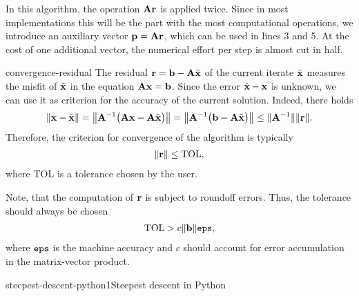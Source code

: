 \begin{remark}
  In this algorithm, the operation $\mata\vr$ is applied twice. Since
  in most implementations this will be the part with the most
  computational operations, we introduce an auxiliary vector
  $\vp = \mata\vr$, which can be used in lines 3 and 5. At the cost of
  one additional vector, the numerical effort per step is almost
  cut in half.
\end{remark}

\begin{Remark}{convergence-residual}
  The residual $\vr = \vb - \mata\tilde\vx$ of the current iterate
  $\tilde\vx$ measures the misfit of $\tilde\vx$ in the equation
  $\mata\vx = \vb$. Since the error $\tilde\vx-\vx$ is unknown, we can
  use it as criterion for the accuracy of the current
  solution. Indeed, there holds
  \begin{gather}
    \norm{\vx-\tilde\vx}
    = \norm*{\mata^{-1}\bigl(\mata\vx - \mata\tilde\vx\bigr)}
    = \norm*{\mata^{-1}\bigl(\vb - \mata\tilde\vx\bigr)}
    \le \norm{\mata^{-1}}\norm{\vr}.
  \end{gather}
  Therefore, the criterion for convergence of the algorithm is typically
  \begin{gather}
    \norm{\vr} \le \text{TOL},
  \end{gather}
  where TOL is a tolerance chosen by the user.

  Note, that the computation of $\vr$ is subject to roundoff
  errors. Thus, the tolerance should always be chosen
  \begin{gather}
    \text{TOL} > c\norm{\vb}\eps,
  \end{gather}
  where $\eps$ is the machine accuracy and $c$ should account for
  error accumulation in the matrix-vector product.
\end{Remark}

\begin{Algorithm*}{steepest-descent-python1}{Steepest descent in Python}
  
\end{Algorithm*}

